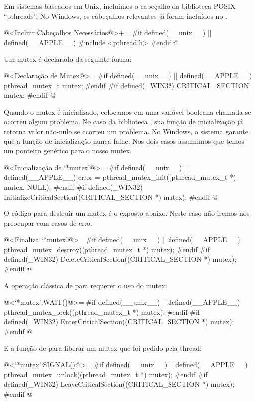 Em sistemas baseados em Unix, incluimos o cabeçalho da biblioteca
POSIX ``pthreads''. No Windows, os cabeçalhos relevantes já foram
incluídos no .

\iniciocodigo
@<Incluir Cabeçalhos Necessários@>+=
#if defined(__unix__) || defined(__APPLE__)
#include <pthread.h>
#endif
@
\fimcodigo

Um mutex é declarado da seguinte forma:

\iniciocodigo
@<Declaração de Mutex@>=
#if defined(__unix__) || defined(__APPLE__)
pthread_mutex_t mutex;
#endif
#if defined(_WIN32)
CRITICAL_SECTION mutex;
#endif
@
\fimcodigo

Quando o mutex é inicializado, colocamos em uma variável booleana
chamada  se ocorreu algum problema. No caso da
biblioteca , sua função de inicialização já retorna
valor não-nulo se ocorreu um problema. No Windows, o sistema garante
que a função de inicialização nunca falhe. Nos dois casos assumimos
que temos um ponteiro genérico para o nosso mutex.

\iniciocodigo
@<Inicialização de `*mutex'@>=
#if defined(__unix__) || defined(__APPLE__)
error = pthread_mutex_init((pthread_mutex_t *) mutex, NULL);
#endif
#if defined(_WIN32)
InitializeCriticalSection((CRITICAL_SECTION *) mutex);
#endif
@
\fimcodigo

O código para destruir um mutex é o exposto abaixo. Neste caso não
iremos nos preocupar com casos de erro.

\iniciocodigo
@<Finaliza `*mutex'@>=
#if defined(__unix__) || defined(__APPLE__)
pthread_mutex_destroy((pthread_mutex_t *) mutex);
#endif
#if defined(_WIN32)
DeleteCriticalSection((CRITICAL_SECTION *) mutex);
#endif
@
\fimcodigo

A operação clássica de  para requerer o uso do mutex:

\iniciocodigo
@<`*mutex':WAIT()@>=
#if defined(__unix__) || defined(__APPLE__)
pthread_mutex_lock((pthread_mutex_t *) mutex);
#endif
#if defined(_WIN32)
EnterCriticalSection((CRITICAL_SECTION *) mutex);
#endif
@
\fimcodigo

E a função de  para liberar um mutex que foi pedido
pela thread:

\iniciocodigo
@<`*mutex':SIGNAL()@>=
#if defined(__unix__) || defined(__APPLE__)
pthread_mutex_unlock((pthread_mutex_t *) mutex);
#endif
#if defined(_WIN32)
LeaveCriticalSection((CRITICAL_SECTION *) mutex);
#endif
@
\fimcodigo


